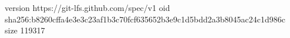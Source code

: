 version https://git-lfs.github.com/spec/v1
oid sha256:b8260cffa4e3e3c23af1b3c70fcf635652b3e9c1d5bdd2a3b8045ac24c1d986c
size 119317
